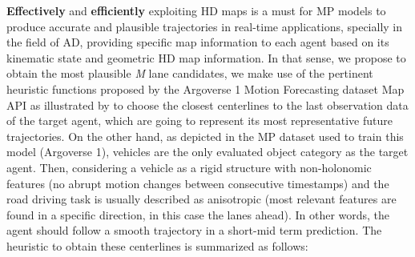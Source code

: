 \textbf{Effectively} and \textbf{efficiently} exploiting HD maps is a must for MP models to produce accurate and plausible trajectories in real-time applications, specially in the field of AD, providing specific map information to each agent based on its kinematic state and geometric HD map information. In that sense, we propose to obtain the most plausible \textit{M} lane candidates, we make use of the pertinent heuristic functions proposed by the Argoverse 1 Motion Forecasting dataset Map API \cite{chang2019argoverse} as illustrated by \cite{khandelwal2020if} to choose the closest centerlines to the last observation data of the target agent, which are going to represent its most representative future trajectories. On the other hand, as depicted in the \ac{MP} dataset used to train this model (Argoverse 1), vehicles are the only evaluated object category as the target agent. Then, considering a vehicle as a rigid structure with non-holonomic \cite{triggs1993motion} features (no abrupt motion changes between consecutive timestamps) and the road driving task is usually described as anisotropic \cite{ross1989planning} (most relevant features are found in a specific direction, in this case the lanes ahead). In other words, the agent should follow a smooth trajectory in a short-mid term prediction. The heuristic to obtain these centerlines is summarized as follows:

